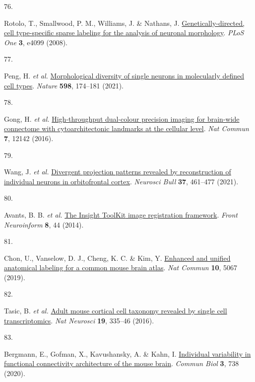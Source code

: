 \documentclass[
  12pt,
]{article}
\newlength{\cslhangindent}
\newlength{\csllabelwidth}
\newenvironment{CSLReferences}[2] %
 {\begin{list}{}{%
  \setlength{\itemindent}{0pt}
  \setlength{\leftmargin}{0pt}
  \setlength{\parsep}{0pt}
  \ifodd #1
   \setlength{\leftmargin}{\cslhangindent}
   \setlength{\itemindent}{-1\cslhangindent}
  \fi
  \setlength{\itemsep}{#2\baselineskip}}}
 {\end{list}}
\newcommand{\CSLLeftMargin}[1]{\parbox[t]{\csllabelwidth}{\strut#1\strut}}
\newcommand{\CSLRightInline}[1]{\parbox[t]{\linewidth - \csllabelwidth}{\strut#1\strut}}
\begin{document}
\begin{CSLReferences}{0}{0}
\CSLLeftMargin{76. }%
\CSLRightInline{Rotolo, T., Smallwood, P. M., Williams, J. \& Nathans,
J.
\href{https://doi.org/10.1371/journal.pone.0004099}{Genetically-directed,
cell type-specific sparse labeling for the analysis of neuronal
morphology}. \emph{PLoS One} \textbf{3}, e4099 (2008).}

\CSLLeftMargin{77. }%
\CSLRightInline{Peng, H. \emph{et al.}
\href{https://doi.org/10.1038/s41586-021-03941-1}{Morphological
diversity of single neurons in molecularly defined cell types}.
\emph{Nature} \textbf{598}, 174--181 (2021).}

\CSLLeftMargin{78. }%
\CSLRightInline{Gong, H. \emph{et al.}
\href{https://doi.org/10.1038/ncomms12142}{High-throughput dual-colour
precision imaging for brain-wide connectome with cytoarchitectonic
landmarks at the cellular level}. \emph{Nat Commun} \textbf{7}, 12142
(2016).}

\CSLLeftMargin{79. }%
\CSLRightInline{Wang, J. \emph{et al.}
\href{https://doi.org/10.1007/s12264-020-00616-1}{Divergent projection
patterns revealed by reconstruction of individual neurons in
orbitofrontal cortex}. \emph{Neurosci Bull} \textbf{37}, 461--477
(2021).}

\CSLLeftMargin{80. }%
\CSLRightInline{Avants, B. B. \emph{et al.}
\href{https://doi.org/10.3389/fninf.2014.00044}{The {Insight} {ToolKit}
image registration framework}. \emph{Front Neuroinform} \textbf{8}, 44
(2014).}

\CSLLeftMargin{81. }%
\CSLRightInline{Chon, U., Vanselow, D. J., Cheng, K. C. \& Kim, Y.
\href{https://doi.org/10.1038/s41467-019-13057-w}{Enhanced and unified
anatomical labeling for a common mouse brain atlas}. \emph{Nat Commun}
\textbf{10}, 5067 (2019).}

\CSLLeftMargin{82. }%
\CSLRightInline{Tasic, B. \emph{et al.}
\href{https://doi.org/10.1038/nn.4216}{Adult mouse cortical cell
taxonomy revealed by single cell transcriptomics}. \emph{Nat Neurosci}
\textbf{19}, 335--46 (2016).}

\CSLLeftMargin{83. }%
\CSLRightInline{Bergmann, E., Gofman, X., Kavushansky, A. \& Kahn, I.
\href{https://doi.org/10.1038/s42003-020-01472-5}{Individual variability
in functional connectivity architecture of the mouse brain}.
\emph{Commun Biol} \textbf{3}, 738 (2020).}


\end{CSLReferences}
\end{document}
